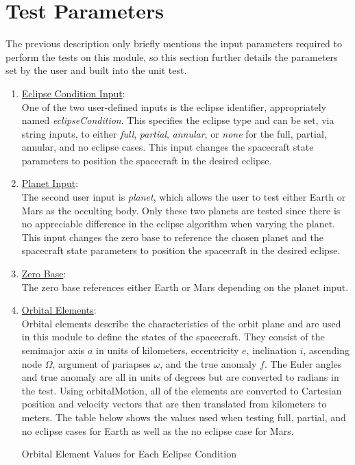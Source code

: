 \section{Test Parameters}
The previous description only briefly mentions the input parameters required to perform the tests on this module, so this section further details the parameters set by the user and built into the unit test.
\begin{enumerate}
	\item \underline{Eclipse Condition Input}:\\
	One of the two user-defined inputs is the eclipse identifier, appropriately named \textit{eclipseCondition}. This specifies the eclipse type and can be set, via string inputs, to either \textit{full}, \textit{partial}, \textit{annular}, or \textit{none} for the full, partial, annular, and no eclipse cases. This input changes the spacecraft state parameters to position the spacecraft in the desired eclipse.
	\item \underline{Planet Input}:\\
	The second user input is \textit{planet}, which allows the user to test either Earth or Mars as the occulting body. Only these two planets are tested since there is no appreciable difference in the eclipse algorithm when varying the planet. This input changes the zero base to reference the chosen planet and the spacecraft state parameters to position the spacecraft in the desired eclipse.
	\item \underline{Zero Base}:\\
	The zero base references either Earth or Mars depending on the planet input.
	\item \underline{Orbital Elements}:\\
	Orbital elements describe the characteristics of the orbit plane and are used in this module to define the states of the spacecraft. They consist of the semimajor axis $a$ in units of kilometers, eccentricity $e$, inclination $i$, ascending node $\Omega$, argument of pariapses $\omega$, and the true anomaly $f$. The Euler angles and true anomaly are all in units of degrees but are converted to radians in the test. Using orbitalMotion, all of the elements are converted to Cartesian position and velocity vectors that are then translated from kilometers to meters. The table below shows the values used when testing full, partial, and no eclipse cases for Earth as well as the no eclipse case for Mars.
	\begin{table}[H]
		\caption{Orbital Element Values for Each Eclipse Condition}\label{tab:OrbElem}

\end{table}
\end{enumerate}
